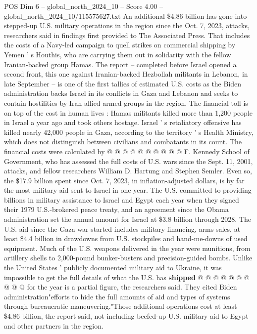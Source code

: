 \begin{textsample}{POS Dim 6 – global\_north\_2024\_10 – Score 4.00 – global\_north\_2024\_10/115575627.txt}  \label{ex:f6_pos_378}
An additional \$4.86 billion has gone into stepped-up U.S. military operations in the region since the Oct. 7, 2023, attacks, researchers said in findings first provided to The Associated Press.
That includes the costs of a Navy-led campaign to quell strikes on commercial shipping by Yemen ' s Houthis, who are carrying them out in solidarity with the fellow Iranian-backed group Hamas.
The report -- completed before Israel opened a second front, this one against Iranian-backed Hezbollah militants in Lebanon, in late September -- is one of the first tallies of estimated U.S. costs as the Biden administration backs Israel in its conflicts in Gaza and Lebanon and seeks to contain hostilities by Iran-allied armed groups in the region.
The financial toll is on top of the cost in human lives : Hamas militants killed more than 1,200 people in Israel a year ago and took others hostage.
Israel ' s retaliatory offensive has killed nearly 42,000 people in Gaza, according to the territory ' s Health Ministry, which does not distinguish between civilians and combatants in its count.
The financial costs were calculated by @ @ @ @ @ @ @ @ @ @ F.
Kennedy School of Government, who has assessed the full costs of U.S. wars since the Sept. 11, 2001, attacks, and fellow researchers William D.
Hartung and Stephen Semler.
Even so, the \$17.9 billion spent since Oct. 7, 2023, in inflation-adjusted dollars, is by far the most military aid sent to Israel in one year.
The U.S. committed to providing billions in military assistance to Israel and Egypt each year when they signed their 1979 U.S.-brokered peace treaty, and an agreement since the Obama administration set the annual amount for Israel at \$3.8 billion through 2028.
The U.S. aid since the Gaza war started includes military financing, arms sales, at least \$4.4 billion in drawdowns from U.S. stockpiles and hand-me-downs of used equipment.
Much of the U.S. weapons delivered in the year were munitions, from artillery shells to 2,000-pound bunker-busters and precision-guided bombs.
Unlike the United States ' publicly documented military aid to Ukraine, it was impossible to get the full details of what the U.S. has \textbf{shipped} @ @ @ @ @ @ @ @ @ @ for the year is a partial figure, the researchers said.
They cited Biden administration"efforts to hide the full amounts of aid and types of systems through bureaucratic maneuvering."Those additional operations cost at least \$4.86 billion, the report said, not including beefed-up U.S. military aid to Egypt and other partners in the region.

\end{textsample}
